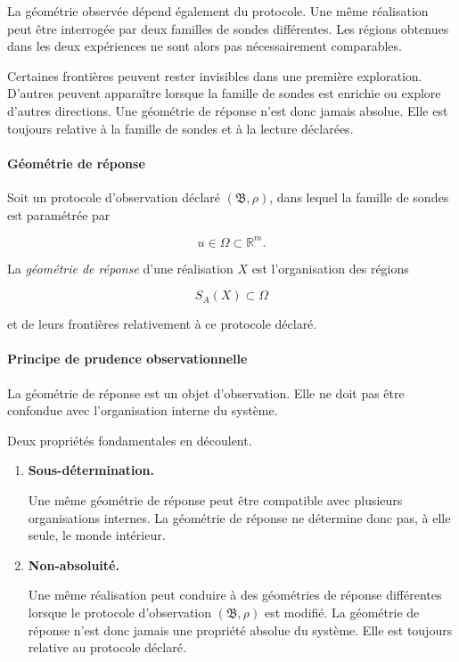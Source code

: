 La géométrie observée dépend également du protocole. Une même réalisation peut être interrogée par deux familles de sondes différentes. Les régions obtenues dans les deux expériences ne sont alors pas nécessairement comparables.

Certaines frontières peuvent rester invisibles dans une première exploration. D'autres peuvent apparaître lorsque la famille de sondes est enrichie ou explore d'autres directions. Une géométrie de réponse n'est donc jamais absolue. Elle est toujours relative à la famille de sondes et à la lecture déclarées.

\paragraph*{Géométrie de réponse}

Soit un protocole d'observation déclaré \((\mathfrak B,\rho)\), dans
lequel la famille de sondes est paramétrée par

\[
u\in\Omega\subset\mathbb R^m.
\]

La \emph{géométrie de réponse} d'une réalisation \(X\) est
l'organisation des régions

\[
S_A(X)\subset\Omega
\]

et de leurs frontières relativement à ce protocole déclaré.
    

\paragraph*{Principe de prudence observationnelle}


La géométrie de réponse est un objet d'observation. Elle ne doit pas être confondue avec l'organisation interne du système.

Deux propriétés fondamentales en découlent.

\begin{enumerate}
\item \textbf{Sous-détermination.}

Une même géométrie de réponse peut être compatible avec plusieurs organisations internes. La géométrie de réponse ne détermine donc pas, à elle seule, le monde intérieur.

\item \textbf{Non-absoluité.}

Une même réalisation peut conduire à des géométries de réponse différentes lorsque le protocole d'observation $(\mathfrak B,\rho)$ est modifié. La géométrie de réponse n'est donc jamais une propriété absolue du système. Elle est toujours relative au protocole déclaré.
\end{enumerate}


